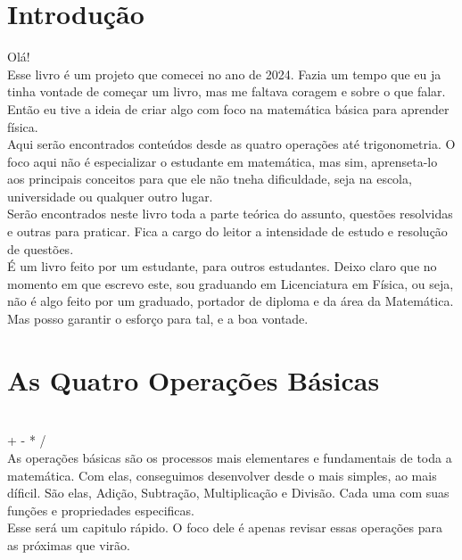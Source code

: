 \documentclass[a4paper, 12pt]{article}
\begin{document}
\maketitle

\section{Introdução}
Olá!\\

 Esse livro é um projeto que comecei no ano de 2024. Fazia um tempo que eu ja tinha vontade de começar um livro, mas me faltava coragem e sobre o que falar. Então eu tive a ideia de criar algo com foco na matemática básica para aprender física.\\
 
 Aqui serão encontrados conteúdos desde as quatro operações até trigonometria. O foco aqui não é especializar o estudante em matemática, mas sim, aprenseta-lo aos principais conceitos para que ele não tneha dificuldade, seja na escola, universidade ou qualquer outro lugar.\\

 Serão encontrados neste livro toda a parte teórica do assunto, questões resolvidas e outras para praticar. Fica a cargo do leitor a intensidade de estudo e resolução de questões.\\

  É um livro feito por um estudante, para outros estudantes. Deixo claro que no momento em que escrevo este, sou graduando em Licenciatura em Física, ou seja, não é algo feito por um graduado, portador de diploma e da área da Matemática. Mas posso garantir o esforço para tal, e a boa vontade. \\

\newpage
\tableofcontents
\newpage
\section{As Quatro Operações Básicas}
\\
+ - * /\\

 As operações básicas são os processos mais elementares e fundamentais de toda a matemática. Com elas, conseguimos desenvolver desde o mais simples, ao mais díficil. São elas, Adição, Subtração, Multiplicação e Divisão. Cada uma com suas funções e propriedades especificas.\\
 
 Esse será um capitulo rápido. O foco dele é apenas revisar essas operações para as próximas que virão.
\end{document}
